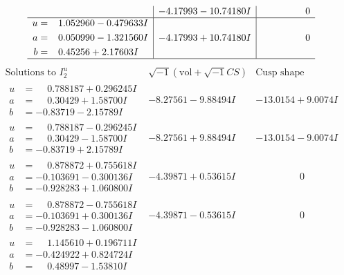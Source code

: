 \documentclass[1p]{elsarticle_modified}
\theoremstyle{definition}
\newcommand{\I}{\sqrt{-1}}
\begin{document}
$$\begin{array}{c|c|c}
 & -4.17993 - 10.74180 I & \phantom{-0.000000 } 0 \\ \hline\begin{aligned}
u &= \phantom{-}1.052960 - 0.479633 I \\
a &= \phantom{-}0.050990 - 1.321560 I \\
b &= \phantom{-}0.45256 + 2.17603 I\end{aligned}
 & -4.17993 + 10.74180 I & \phantom{-0.000000 } 0\\
 \hline 
 \end{array}$$\newpage$$\begin{array}{c|c|c}  
\text{Solutions to }I^u_{2}& \I (\text{vol} + \sqrt{-1}CS) & \text{Cusp shape}\\
 \hline 
\begin{aligned}
u &= \phantom{-}0.788187 + 0.296245 I \\
a &= \phantom{-}0.30429 + 1.58700 I \\
b &= -0.83719 - 2.15789 I\end{aligned}
 & -8.27561 - 9.88494 I & -13.0154 + 9.0074 I \\ \hline\begin{aligned}
u &= \phantom{-}0.788187 - 0.296245 I \\
a &= \phantom{-}0.30429 - 1.58700 I \\
b &= -0.83719 + 2.15789 I\end{aligned}
 & -8.27561 + 9.88494 I & -13.0154 - 9.0074 I \\ \hline\begin{aligned}
u &= \phantom{-}0.878872 + 0.755618 I \\
a &= -0.103691 - 0.300136 I \\
b &= -0.928283 + 1.060800 I\end{aligned}
 & -4.39871 + 0.53615 I & \phantom{-0.000000 } 0 \\ \hline\begin{aligned}
u &= \phantom{-}0.878872 - 0.755618 I \\
a &= -0.103691 + 0.300136 I \\
b &= -0.928283 - 1.060800 I\end{aligned}
 & -4.39871 - 0.53615 I & \phantom{-0.000000 } 0 \\ \hline\begin{aligned}
u &= \phantom{-}1.145610 + 0.196711 I \\
a &= -0.424922 + 0.824724 I \\
b &= \phantom{-}0.48997 - 1.53810 I\end{aligned}

\end{array}$$
\end{document}
